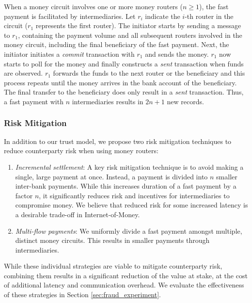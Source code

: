 When a money circuit involves one or more money routers ($ n \geq 1 $), the fast payment is facilitated by intermediaries.
Let $ r_i $ indicate the $ i $-th router in the circuit ($ r_1 $ represents the first router).
The initiator starts by sending a message to $ r_1 $, containing the payment volume and all subsequent routers involved in the money circuit, including the final beneficiary of the fast payment.
Next, the initiator initiates a \emph{commit} transaction with $ r_1 $ and sends the money.
$ r_1 $ now starts to poll for the money and finally constructs a \emph{sent} transaction when funds are observed.
$ r_1 $ forwards the funds to the next router or the beneficiary and this process repeats until the money arrives in the bank account of the beneficiary.
The final transfer to the beneficiary does only result in a \emph{sent} transaction.
Thus, a fast payment with $ n $ intermediaries results in $ 2n+1 $ new records.


\subsubsection*{Risk Mitigation}
In addition to our trust model, we propose two risk mitigation techniques to reduce counterparty risk when using money routers:
\begin{enumerate}
	\item \emph{Incremental settlement}: A key risk mitigation technique is to avoid making a single, large payment at once. Instead, a payment is divided into $ n $ smaller inter-bank payments. While this increases duration of a fast payment by a factor $ n $, it significantly reduces risk and incentives for intermediaries to compromise money. We believe that reduced risk for some increased latency is a desirable trade-off in Internet-of-Money.
	\item \emph{Multi-flow payments}: We uniformly divide a fast payment amongst multiple, distinct money circuits. This results in smaller payments through intermediaries.
\end{enumerate}
While these individual strategies are viable to mitigate counterparty risk, combining them results in a significant reduction of the value at stake, at the cost of additional latency and communication overhead.
We evaluate the effectiveness of these strategies in Section \ref{sec:fraud_experiment}.

